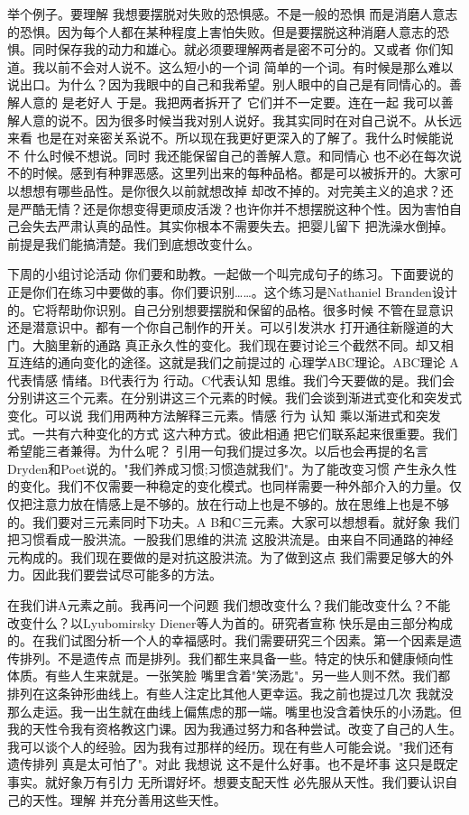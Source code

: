 举个例子。要理解 我想要摆脱对失败的恐惧感。不是一般的恐惧 而是消磨人意志的恐惧。因为每个人都在某种程度上害怕失败。但是要摆脱这种消磨人意志的恐惧。同时保存我的动力和雄心。就必须要理解两者是密不可分的。又或者 你们知道。我以前不会对人说不。这么短小的一个词 简单的一个词。有时候是那么难以说出口。为什么？因为我眼中的自己和我希望。别人眼中的自己是有同情心的。善解人意的 是老好人 于是。我把两者拆开了 它们并不一定要。连在一起 我可以善解人意的说不。因为很多时候当我对别人说好。我其实同时在对自己说不。从长远来看 也是在对亲密关系说不。所以现在我更好更深入的了解了。我什么时候能说不 什么时候不想说。同时 我还能保留自己的善解人意。和同情心 也不必在每次说不的时候。感到有种罪恶感。这里列出来的每种品格。都是可以被拆开的。大家可以想想有哪些品性。是你很久以前就想改掉 却改不掉的。对完美主义的追求？还是严酷无情？还是你想变得更顽皮活泼？也许你并不想摆脱这种个性。因为害怕自己会失去严肃认真的品性。其实你根本不需要失去。把婴儿留下 把洗澡水倒掉。前提是我们能搞清楚。我们到底想改变什么。 

下周的小组讨论活动 你们要和助教。一起做一个叫完成句子的练习。下面要说的正是你们在练习中要做的事。你们要识别……。这个练习是Nathaniel Branden设计的。它将帮助你识别。自己分别想要摆脱和保留的品格。很多时候 不管在显意识还是潜意识中。都有一个你自己制作的开关。可以引发洪水 打开通往新隧道的大门。大脑里新的通路 真正永久性的变化。我们现在要讨论三个截然不同。却又相互连结的通向变化的途径。这就是我们之前提过的 心理学ABC理论。ABC理论 A代表情感 情绪。B代表行为 行动。C代表认知 思维。我们今天要做的是。我们会分别讲这三个元素。在分别讲这三个元素的时候。我们会谈到渐进式变化和突发式变化。可以说 我们用两种方法解释三元素。情感 行为 认知 乘以渐进式和突发式。一共有六种变化的方式 这六种方式。彼此相通 把它们联系起来很重要。我们希望能三者兼得。为什么呢？ 引用一句我们提过多次。以后也会再提的名言 Dryden和Poet说的。"我们养成习惯;习惯造就我们"。为了能改变习惯 产生永久性的变化。我们不仅需要一种稳定的变化模式。也同样需要一种外部介入的力量。仅仅把注意力放在情感上是不够的。放在行动上也是不够的。放在思维上也是不够的。我们要对三元素同时下功夫。A B和C三元素。大家可以想想看。就好象 我们把习惯看成一股洪流。一股我们思维的洪流 这股洪流是。由来自不同通路的神经元构成的。我们现在要做的是对抗这股洪流。为了做到这点 我们需要足够大的外力。因此我们要尝试尽可能多的方法。 

在我们讲A元素之前。我再问一个问题 我们想改变什么？我们能改变什么？不能改变什么？以Lyubomirsky Diener等人为首的。研究者宣称 快乐是由三部分构成的。在我们试图分析一个人的幸福感时。我们需要研究三个因素。第一个因素是遗传排列。不是遗传点 而是排列。我们都生来具备一些。特定的快乐和健康倾向性体质。有些人生来就是。一张笑脸 嘴里含着"笑汤匙"。另一些人则不然。我们都排列在这条钟形曲线上。有些人注定比其他人更幸运。我之前也提过几次 我就没那么走运。我一出生就在曲线上偏焦虑的那一端。嘴里也没含着快乐的小汤匙。但我的天性令我有资格教这门课。因为我通过努力和各种尝试。改变了自己的人生。我可以谈个人的经验。因为我有过那样的经历。现在有些人可能会说。"我们还有遗传排列 真是太可怕了"。对此 我想说 这不是什么好事。也不是坏事 这只是既定事实。就好象万有引力 无所谓好坏。想要支配天性 必先服从天性。我们要认识自己的天性。理解 并充分善用这些天性。 

